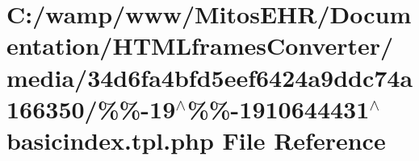 \hypertarget{media_234d6fa4bfd5eef6424a9ddc74a166350_2_06_06-19_05_06_06-1910644431_05basicindex_8tpl_8php}{\section{\-C\-:/wamp/www/\-Mitos\-E\-H\-R/\-Documentation/\-H\-T\-M\-Lframes\-Converter/media/34d6fa4bfd5eef6424a9ddc74a166350/\%\%-\/19$^\wedge$\%\%-\/1910644431$^\wedge$basicindex.tpl.\-php \-File \-Reference}
\label{media_234d6fa4bfd5eef6424a9ddc74a166350_2_06_06-19_05_06_06-1910644431_05basicindex_8tpl_8php}
}
